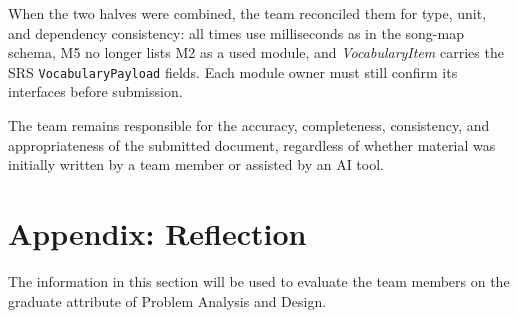 \documentclass[12pt, titlepage]{article}
\begin{document}
When the two halves were combined, the team reconciled them for type,
unit, and dependency consistency: all times use milliseconds as in the
song-map schema, M5 no longer lists M2 as a used module, and
\textit{VocabularyItem} carries the SRS \texttt{VocabularyPayload}
fields.  Each module owner must still confirm its interfaces before
submission.

The team remains responsible for the accuracy, completeness, consistency, and
appropriateness of the submitted document, regardless of whether material was
initially written by a team member or assisted by an AI tool.

\newpage{}

\section{Appendix: Reflection}

The information in this section will be used to evaluate the team members on the
graduate attribute of Problem Analysis and Design.


\end{document}
